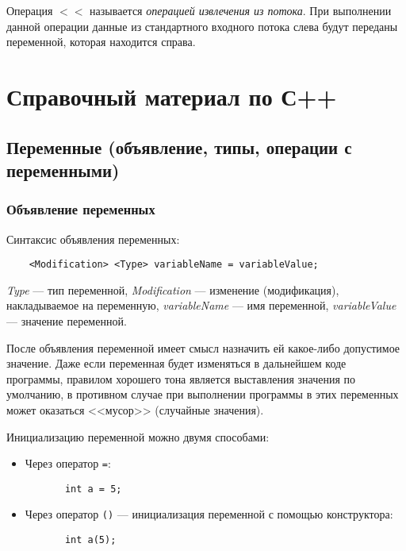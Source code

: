 Операция $<<$ называется \textit{операцией извлечения из потока}. При выполнении данной операции данные из стандартного входного потока слева будут переданы переменной, которая находится справа.

\section{Справочный материал по С++}

\subsection{Переменные (объявление, типы, операции с переменными)}

\subsubsection{Объявление переменных}
Синтаксис объявления переменных:

\begin{lstlisting}
    <Modification> <Type> variableName = variableValue;
\end{lstlisting}

\textit{Type} --- тип переменной, \textit{Modification} --- изменение (модификация), накладываемое на переменную, \textit{variableName} --- имя переменной, \textit{variableValue} --- значение переменной.

После объявления переменной имеет смысл назначить ей какое-либо допустимое значение. Даже если переменная будет изменяться в дальнейшем коде программы, правилом хорошего тона является выставления значения по умолчанию, в противном случае при выполнении программы в этих переменных может оказаться <<мусор>> (случайные значения).

Инициализацию переменной можно двумя способами:
\begin{itemize}
    \item Через оператор \lstinline{=}:
    \begin{lstlisting}
       int a = 5;
    \end{lstlisting}
    \item Через оператор \lstinline{()} --- инициализация переменной с помощью конструктора:
    \lstset{style=CPlusPlus}
    \begin{lstlisting}
       int a(5);
    \end{lstlisting}
\end{itemize}

